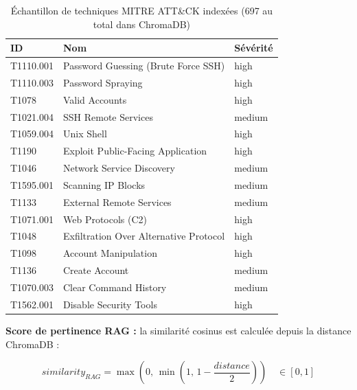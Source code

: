 \documentclass[12pt,a4paper]{report}
\begin{document}
\begin{table}[H]
\centering
\caption{Échantillon de techniques MITRE ATT\&CK indexées (697 au total dans ChromaDB)}
\label{tab:mitre_sample}
\begin{tabular}{|p{2.5cm}|p{5cm}|p{1.5cm}|}
\hline
\textbf{ID} & \textbf{Nom} & \textbf{Sévérité} \\
\hline
T1110.001 & Password Guessing (Brute Force SSH) & high \\
\hline
T1110.003 & Password Spraying & high \\
\hline
T1078 & Valid Accounts & high \\
\hline
T1021.004 & SSH Remote Services & medium \\
\hline
T1059.004 & Unix Shell & high \\
\hline
T1190 & Exploit Public-Facing Application & high \\
\hline
T1046 & Network Service Discovery & medium \\
\hline
T1595.001 & Scanning IP Blocks & medium \\
\hline
T1133 & External Remote Services & medium \\
\hline
T1071.001 & Web Protocols (C2) & high \\
\hline
T1048 & Exfiltration Over Alternative Protocol & high \\
\hline
T1098 & Account Manipulation & high \\
\hline
T1136 & Create Account & medium \\
\hline
T1070.003 & Clear Command History & medium \\
\hline
T1562.001 & Disable Security Tools & high \\
\hline
\end{tabular}
\end{table}

\begin{onehalfspace}
\textbf{Score de pertinence RAG :} la similarité cosinus est calculée depuis
la distance ChromaDB :

\begin{tcolorbox}[colback=lightblue, colframe=darkblue, arc=5pt,
  title={\textbf{Score de pertinence RAG}}]
\[
similarity_{RAG} = \max\!\left(0,\, \min\!\left(1,\, 1 - \frac{distance}{2}\right)\right)
\quad \in [0, 1]
\]
\end{tcolorbox}
\end{onehalfspace}
\end{document}
